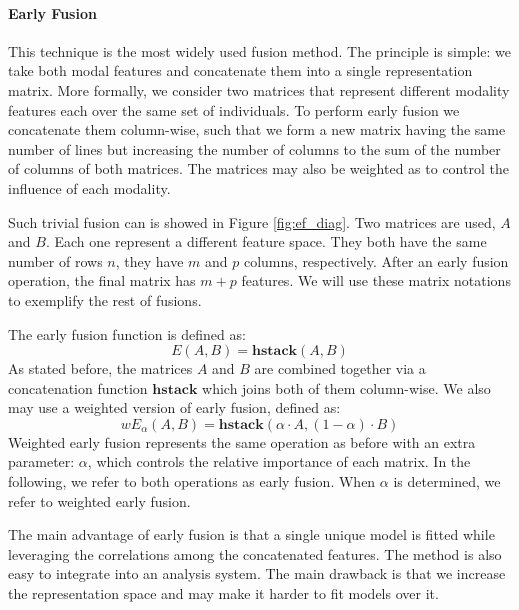 \paragraph{Early Fusion}
This technique is the most widely used fusion method. The principle is simple: we take both modal features and concatenate them into a single representation matrix. More formally, we consider two matrices  that represent different modality features each  over the same set of individuals. To perform early fusion we concatenate them column-wise, such that we form a new matrix having the same number of lines but increasing the number of columns to the sum of the number of columns of both matrices. The matrices may also be weighted as to control the influence of each modality.

Such trivial fusion can is showed in Figure \ref{fig:ef_diag}. Two matrices are used, $A$ and $B$. Each one represent a different feature space. They both have the same number of rows $n$, they have $m$ and $p$ columns, respectively. After an early fusion operation, the final matrix has $m+p$ features. We will use these matrix notations to exemplify the rest of fusions.



The early fusion function is defined as:
\begin{equation}
E(A,B) = \mathbf{hstack}(A , B)
\end{equation}
As stated before, the matrices $A$ and $B$ are combined together via a concatenation function $\mathbf{hstack}$ which joins both of them column-wise.
We also may use a weighted version of early fusion, defined as: 
\begin{equation}
wE_\alpha(A,B) = \mathbf{hstack}(\alpha\cdot A , (1-\alpha)\cdot B)
\end{equation}
Weighted early fusion  represents the same operation as before with an extra parameter: $\alpha$, which controls the relative importance of each matrix. In the following, we refer to both operations as early fusion. When $\alpha$ is determined, we refer to weighted early fusion.

The main advantage of early fusion is that a single unique model is fitted while leveraging the correlations among the concatenated features. The method is also easy to integrate into an analysis system. The main drawback is that we increase the representation space and may make it harder to fit models over it.

